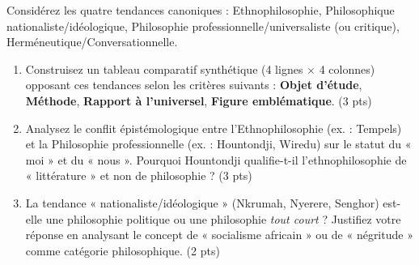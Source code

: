 \documentclass[11pt]{article}
\begin{document}
\begin{exercice}
Considérez les quatre tendances canoniques : Ethnophilosophie, Philosophique nationaliste/idéologique, Philosophie professionnelle/universaliste (ou critique), Herméneutique/Conversationnelle.

\begin{enumerate}
    \item Construisez un tableau comparatif synthétique (4 lignes $\times$ 4 colonnes) opposant ces tendances selon les critères suivants : \textbf{Objet d'étude}, \textbf{Méthode}, \textbf{Rapport à l'universel}, \textbf{Figure emblématique}. (3 pts)
    \item Analysez le conflit épistémologique entre l'Ethnophilosophie (ex. : Tempels) et la Philosophie professionnelle (ex. : Hountondji, Wiredu) sur le statut du « moi » et du « nous ». Pourquoi Hountondji qualifie-t-il l'ethnophilosophie de « littérature » et non de philosophie ? (3 pts)
    \item La tendance « nationaliste/idéologique » (Nkrumah, Nyerere, Senghor) est-elle une philosophie politique ou une philosophie \textit{tout court} ? Justifiez votre réponse en analysant le concept de « socialisme africain » ou de « négritude » comme catégorie philosophique. (2 pts)
\end{enumerate}
\end{exercice}
\end{document}
